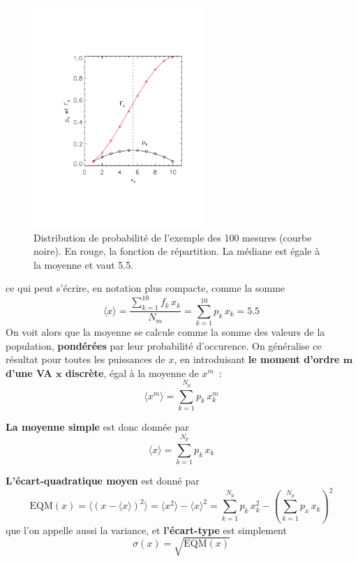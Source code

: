 \begin{figure}
   \centering
   \vspace{-4mm}
   \includegraphics[width=6.5cm]{assets/figures/probabiliteEtfonctiondeRepartition.pdf}
   \caption{Distribution de probabilité de l'exemple des 100 mesures (courbe noire). En rouge, la fonction de répartition. La médiane est égale à la moyenne et vaut 5.5.}
   \label{fig:edfdr}
\end{figure}

ce qui peut s'écrire, en notation plus compacte, comme la somme
\begin{equation}
\langle x\rangle=\frac{\sum_{k=1}^{10}f_k\,x_k}{N_m}=\sum_{k=1}^{10}p_k\,x_k=5.5
\end{equation}
On voit alors que la moyenne se calcule comme la somme des valeurs de la population, \textbf{pondérées} par leur probabilité d'occurence. On généralise ce résultat pour toutes les puissances de $x$, en introduisant \textbf{le moment d'ordre $\mathbf{m}$ d'une VA $\mathbf{x}$ discrète}, égal à la moyenne de $x^m$~:
\begin{equation}
\langle x^m\rangle=\sum_{k=1}^{N_p}p_k\,x_k^m
\end{equation}

\noindent\textbf{La moyenne simple} est donc donnée par
\begin{equation}
\langle x\rangle=\sum_{k=1}^{N_p}p_k\,x_k
\end{equation}

\textbf{L'écart-quadratique moyen} est donné par
\begin{equation}
\text{EQM}(x)=\langle (x-\langle x\rangle)^2\rangle=\langle x^2\rangle-\langle x\rangle^2=\sum_{k=1}^{N_p}p_k\,x_k^2-\left(\sum_{k=1}^{N_p}p_x\,x_k\right)^2
\end{equation}
que l'on appelle aussi la variance, et \textbf{l'écart-type} est simplement
\begin{equation}
\sigma(x)=\sqrt{\text{EQM}(x)}
\end{equation}

